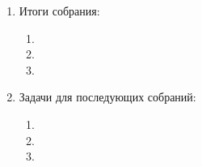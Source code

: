 \begin{enumerate}
\begin{enumerate}
	\end{enumerate}
	
	\item Итоги собрания:
	\begin{enumerate}
		
		\item 
		
		\item 
		
        \item 
		
	\end{enumerate}
	
	\item Задачи для последующих собраний:
	\begin{enumerate}
		
		\item 
		
		\item 
		
        \item 
			
	\end{enumerate}
\end{enumerate}
\fillpage
